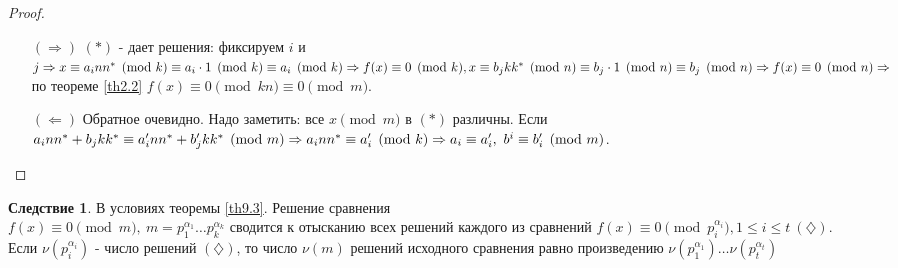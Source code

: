 \documentclass[a4paper, 12pt]{article}
\newcommand\tab[1][.5cm]{\hspace*{#1}}
\theoremstyle{definition}
\newtheorem*{consequense}{Следствие}
\begin{document}
    \begin{proof}\tab
        \begin{itemize}
            \item[$(\Rightarrow)$] $(\ast)$ - дает решения: фиксируем $i$ и $j\\
            \Rightarrow x\equiv a_i n n^* \pmod{k}\equiv a_i\cdot 1\pmod{k}\equiv a_i\pmod{k}\Rightarrow f(x)\equiv 0\pmod{k},\\
            x\equiv b_j k k^*\pmod{n}\equiv b_j\cdot 1\pmod{n}\equiv b_j\pmod{n}\Rightarrow f(x)\equiv0\pmod{n}\\
            \Rightarrow$ по теореме \ref{th2.2} $f(x)\equiv 0\pmod{kn}\equiv 0\pmod{m}$.
            \item[$(\Leftarrow)$] Обратное очевидно. Надо заметить: все $x\pmod{m}$ в $(\ast)$ различны. Если $a_i n n^*+b_j k k^*\equiv a_i^{\prime}nn^*+b_j^{\prime} k k^* \pmod{m} \Rightarrow a_i n n^*\equiv a_i^{\prime} \pmod{k}\\
            \Rightarrow a_i\equiv a_i^{\prime},\ b^i\equiv b_i^{\prime} \pmod{m}$.
        \end{itemize}
    \end{proof} 
    \begin{consequense}
        В условиях теоремы \ref{th9.3}. Решение сравнения\\
        $f(x)\equiv 0\pmod{m},\ m=p_1^{\alpha_1}\dots p_k^{\alpha_k}$ сводится к отысканию всех решений каждого из сравнений $f(x)\equiv 0\pmod{p_i^{\alpha_i}}, 1\leq i\leq t\ (\diamondsuit)$.\\
        Если $\nu(p_i^{\alpha_i})$ - число решений $(\diamondsuit)$, то число $\nu(m)$ решений исходного сравнения равно произведению $\nu(p_1^{\alpha_1})\dots \nu(p_t^{\alpha_t})$
    \end{consequense} 
\end{document}
